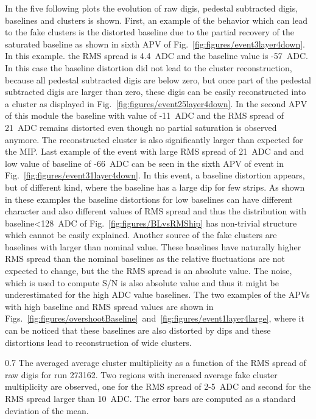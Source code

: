 In the five following plots the evolution of raw digis, pedestal subtracted digis, baselines and clusters is shown. First, an example of the behavior which can lead to the fake clusters is the distorted baseline due to the partial recovery of the saturated baseline as shown in sixth APV of Fig.~\ref{fig:figures/event3layer4down}. In this example. the RMS spread is 4.4~ADC and the baseline value is -57~ADC. In this case the baseline distortion did not lead to the cluster reconstruction, because all pedestal subtracted digis are below zero, but once part of the pedestal subtracted digis are larger than zero, these digis can be easily reconstructed into a cluster as displayed in Fig.~\ref{fig:figures/event25layer4down}. In the second APV of this module the baseline with value of -11~ADC and the RMS spread of 21~ADC remains distorted even though no partial saturation is observed anymore. The reconstructed cluster is also significantly larger than expected for the MIP. Last example of the event with large RMS spread of 21~ADC and and low value of baseline of -66~ADC can be seen in the sixth APV of event in Fig.~\ref{fig:figures/event31layer4down}. In this event, a baseline distortion appears, but of different kind, where the baseline has a large dip for few strips. As shown in these examples the baseline distortions for low baselines can have different character and also different values of RMS spread and thus the distribution with baseline<128~ADC of Fig.~\ref{fig:figures/BLvsRMShip} has non-trivial structure which cannot be easily explained. Another source of the fake clusters are baselines with larger than nominal value. These baselines have naturally higher RMS spread than the nominal baselines as the relative fluctuations are not expected to change, but the the RMS spread is an absolute value. The noise, which is used to compute S/N is also absolute value and thus it might be underestimated for the high ADC value baselines. The two examples of the APVs with high baseline and RMS spread values are shown in Figs.~\ref{fig:figures/overshootBaseline}~and~\ref{fig:figures/event1layer4large}, where it can be noticed that these baselines are also distorted by dips and these distortions lead to reconstruction of wide clusters.


                 {0.7}       %
                 {The averaged average cluster multiplicity as a function of the RMS spread of raw digis for run 273162. Two regions with increased average fake cluster multiplicity are observed, one for the RMS spread of 2-5~ADC and second for the RMS spread larger than 10~ADC. The error bars are computed as a standard deviation of the mean. } %

